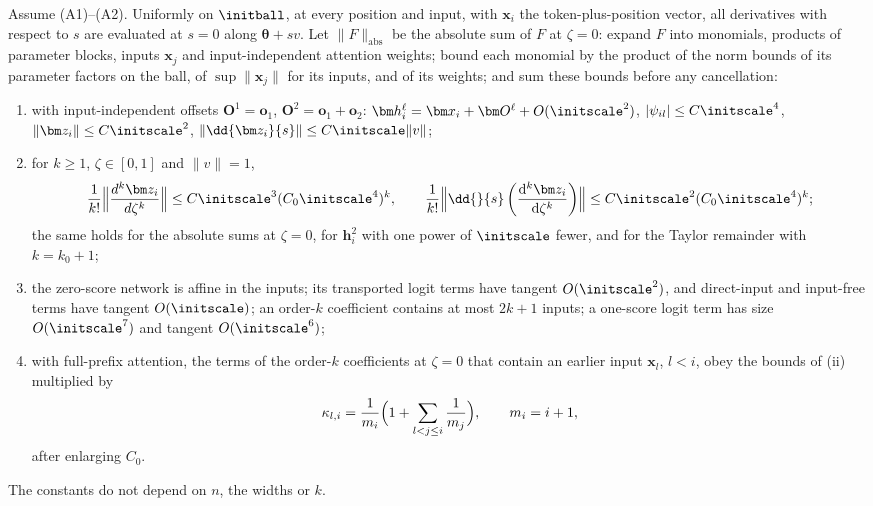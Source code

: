 \begin{proposition}
\label{prop:network}
Assume (A1)--(A2). Uniformly on $\initball$, at every position and input, with $\bm x_i$ the token-plus-position vector,
all derivatives with respect to $s$ are evaluated at $s=0$ along $\bm\theta+sv$.
Let $\|F\|_{\mathrm{abs}}$ be the absolute sum of $F$ at $\zeta=0$: expand $F$ into monomials, products of
parameter blocks, inputs $\bm x_j$ and input-independent attention weights; bound each monomial by the product of the norm bounds of its
parameter factors on the ball, of $\sup\|\bm x_j\|$ for its inputs, and of its weights; and sum these bounds before any cancellation:
\begin{enumerate}[label=(\roman*),leftmargin=*,itemsep=3pt,topsep=4pt]
\item with input-independent offsets $\bm O^1=\bm o_1$, $\bm O^2=\bm o_1+\bm o_2$: $\bm h_i^\ell=\bm x_i+\bm O^\ell+O(\initscale^2)$, $|\psi_{il}|\le C\initscale^4$,
$\|\bm z_i\|\le C\initscale^2$, $\|\dd{\bm z_i}{s}\|\le C\initscale\|v\|$;
\item for $k\ge1$, $\zeta\in[0,1]$ and $\|v\|=1$,
\[
 \frac{1}{k!}\Bigl\|\frac{d^k\bm z_i}{d\zeta^k}\Bigr\|\le C\initscale^3(C_0\initscale^4)^k,\qquad
 \frac{1}{k!}\Bigl\|\dd{}{s}\left(\frac{\mathrm d^k\bm z_i}{\mathrm d\zeta^k}\right)\Bigr\|\le C\initscale^2(C_0\initscale^4)^k;
\]
the same holds for the absolute sums at $\zeta=0$, for $\bm h^2_i$ with one power of $\initscale$ fewer, and for the Taylor remainder with $k=k_0+1$;
\item the zero-score network is affine in the inputs; its transported logit terms have tangent $O(\initscale^2)$, and direct-input and
input-free terms have tangent $O(\initscale)$; an order-$k$ coefficient contains at most $2k+1$ inputs; a one-score logit term has size
$O(\initscale^7)$ and tangent $O(\initscale^6)$;
\item with full-prefix attention, the terms of the order-$k$ coefficients at $\zeta=0$ that contain an earlier input $\bm x_l$, $l<i$, obey the
bounds of (ii) multiplied by
\begin{equation}
 \kappa_{l,i}=\frac{1}{m_i}\Bigl(1+\sum_{l<j\le i}\frac{1}{m_j}\Bigr),\qquad m_i=i+1,
 \label{eq:dilution}
\end{equation}
after enlarging $C_0$.
\end{enumerate}
The constants do not depend on $n$, the widths or $k$.
\end{proposition}

